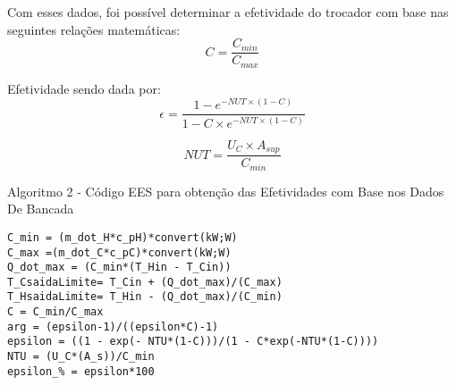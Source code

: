 \documentclass[a4paper,12pt,oneside]{article}
\begin{document}
\begin{flushright}
Com esses dados, foi possível determinar a efetividade do trocador com base nas seguintes relações matemáticas:\\

\begin{equation}\label{eq47}
	C = \frac{C_{min}}{C_{max}}
\end{equation}
\vspace{0.5cm}

Efetividade sendo dada por:\\

\begin{equation}\label{eq48}
	\epsilon = \frac{1 - e^{-NUT \times (1 - C)}}{1 - C\times e^{-NUT\times(1-C)}}
\end{equation}
\vspace{0.5cm}

\begin{equation}\label{eq49}
	NUT = \frac{U_{C} \times A_{sup}}{C_{min}}
\end{equation}
\vspace{0.5cm}



\lstset{style=mystyle}
\begin{center}
	\normalsize{Algoritmo 2 - Código EES para obtenção das Efetividades com Base nos Dados De Bancada}
\end{center}
\vspace{0.5cm}
\begin{lstlisting}
C_min = (m_dot_H*c_pH)*convert(kW;W)
C_max =(m_dot_C*c_pC)*convert(kW;W)
Q_dot_max = (C_min*(T_Hin - T_Cin))
T_CsaidaLimite= T_Cin + (Q_dot_max)/(C_max)
T_HsaidaLimite= T_Hin - (Q_dot_max)/(C_min)
C = C_min/C_max
arg = (epsilon-1)/((epsilon*C)-1)
epsilon = ((1 - exp(- NTU*(1-C)))/(1 - C*exp(-NTU*(1-C))))
NTU = (U_C*(A_s))/C_min
epsilon_% = epsilon*100
\end{lstlisting}
\vspace{0.5cm}


\end{flushright}
\end{document}
